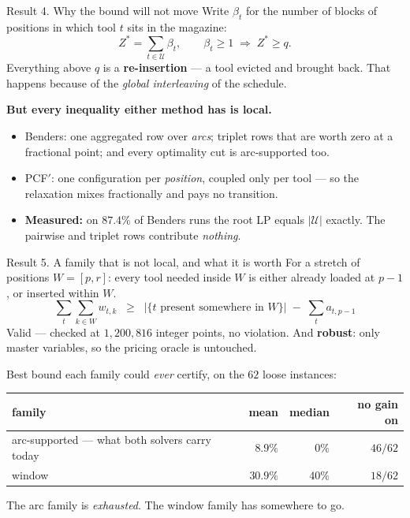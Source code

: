 \documentclass[11pt,aspectratio=169]{beamer}
\newcommand{\Zst}{Z^{*}}
\newcommand{\U}{\mathcal{U}}
\newcommand{\new}[1]{{\color{cAccent}#1}}
\newcommand{\keyline}[1]{\vspace{0.4em}{\color{cRule}\rule{\textwidth}{0.4pt}}\vspace{0.3em}\par#1}
\begin{document}
\begin{frame}{\new{Result 4.} Why the bound will not move}
\vspace{0.1em}
Write $\beta_t$ for the number of blocks of positions in which tool $t$ sits in the magazine:
\[
  \Zst=\sum_{t\in\U}\beta_t,\qquad \beta_t\ge1 \;\Longrightarrow\; \Zst \ge q .
\]
{\small Everything above $q$ is a \textbf{re-insertion} --- a tool evicted and brought
back. That happens because of the \emph{global interleaving} of the schedule.}
\vspace{0.4em}
\keyline{}
\begin{center}
\textbf{But every inequality either method has is \new{local}.}
\end{center}
\vspace{0.1em}
\begin{itemize}\itemsep3pt\small
  \item Benders: one aggregated row over \emph{arcs}; triplet rows that are worth zero at
  a fractional point; and every optimality cut is arc-supported too.
  \item PCF$'$: one configuration per \emph{position}, coupled only per tool --- so the
  relaxation mixes fractionally and pays no transition.
  \item \textbf{Measured:} on $87.4\%$ of Benders runs the root LP equals $|\U|$ exactly.
  The pairwise and triplet rows contribute \emph{nothing}.
\end{itemize}
\end{frame}

\begin{frame}{\new{Result 5.} A family that is not local, and what it is worth}
\vspace{0.1em}
{\small For a stretch of positions $W=[p,r]$: every tool needed inside $W$ is either
already loaded at $p-1$, or inserted within $W$.}
\[
  \sum_{t}\sum_{k\in W} w_{t,k} \;\;\ge\;\;
  \bigl|\{t \text{ present somewhere in } W\}\bigr| \;-\; \sum_{t} a_{t,p-1}
\]
{\small Valid --- checked at $1{,}200{,}816$ integer points, no violation. And
\textbf{robust}: only master variables, so the pricing oracle is untouched.}
\vspace{0.4em}
\keyline{}
\centering
{\small Best bound each family could \emph{ever} certify, on the $62$ loose instances:}\\[0.5em]
\begin{tabular}{@{}lrrr@{}}
\toprule
family & mean & median & no gain on\\
\midrule
arc-supported --- what both solvers carry today & $8.9\%$ & $0\%$ & $46/62$\\
\new{window} & \new{$30.9\%$} & \new{$40\%$} & $18/62$\\
\bottomrule
\end{tabular}
\vspace{0.4em}

{\small The arc family is \emph{exhausted}. The window family has somewhere to go.}
\end{frame}
\end{document}

